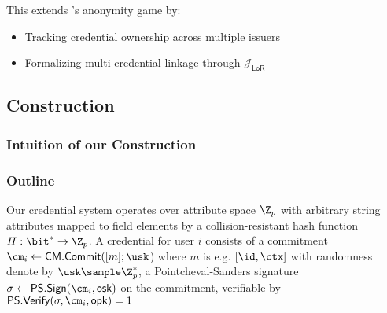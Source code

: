 \begin{remark}
This extends \cite{fuchsbauer_structure-preserving_2019}'s anonymity game by:
\begin{itemize}
    \item Tracking credential ownership across multiple issuers
    \item Formalizing multi-credential linkage through $\mathcal{J}_{\mathsf{LoR}}$
\end{itemize}
\end{remark}










































\newpage
\subsection{Construction}\label{sec:mimcabc-construction}
\subsubsection{Intuition of our Construction}




\subsubsection{Outline}
Our credential system operates over attribute space $\Z_p$ with arbitrary string attributes mapped to field elements by a collision-resistant hash function $H: \bit^* \to \Z_p$. A credential for user $i$ consists of a 
commitment $\cm_i \gets \mathsf{CM.Commit}([m]; \usk$) where $m$ is e.g. $[\id, \ctx]$ with randomness denote by $\usk \sample \Z_p^*$, a Pointcheval-Sanders signature $\sigma \gets \mathsf{PS.Sign}(\cm_i, \mathsf{osk})$ on the commitment, verifiable by $\mathsf{PS.Verify}(\sigma, \cm_i, \mathsf{opk}) = 1$

